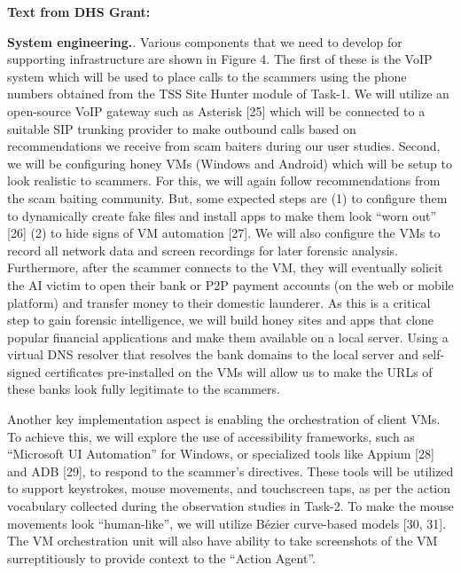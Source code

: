 \textbf{Text from DHS Grant:}

\textbf{System engineering.}. Various components that we need to develop for supporting
infrastructure are shown in Figure 4. The first of these is the VoIP system which will be used to place
calls to the scammers using the phone numbers obtained from the TSS Site Hunter module of Task-1. We
will utilize an open-source VoIP gateway such as Asterisk [25] which will be connected to a suitable SIP
trunking provider to make outbound calls based on recommendations we receive from scam baiters during
our user studies. Second, we will be configuring honey VMs (Windows and Android) which will be setup
to look realistic to scammers. For this, we will again follow recommendations from the scam baiting
community. But, some expected steps are (1) to configure them to dynamically create fake files and
install apps to make them look “worn out” [26] (2) to hide signs of VM automation [27]. We will also
configure the VMs to record all network data and screen recordings for later forensic analysis.
Furthermore, after the scammer connects to the VM, they will eventually solicit the AI victim to open
their bank or P2P payment accounts (on the web or mobile platform) and transfer money to their domestic
launderer. As this is a critical step to gain forensic intelligence, we will build honey sites and apps that
clone popular financial applications and make them available on a local server. Using a virtual DNS
resolver that resolves the bank domains to the local server and self-signed certificates pre-installed on the
VMs will allow us to make the URLs of these banks look fully legitimate to the scammers.


Another key implementation aspect is enabling the orchestration of client VMs. To achieve this, we will
explore the use of accessibility frameworks, such as “Microsoft UI Automation” for Windows, or
specialized tools like Appium [28] and ADB [29], to respond to the scammer's directives. These tools
will be utilized to support keystrokes, mouse movements, and touchscreen taps, as per the action
vocabulary collected during the observation studies in Task-2. To make the mouse movements look
“human-like”, we will utilize Bézier curve-based models [30, 31]. The VM orchestration unit will also
have ability to take screenshots of the VM surreptitiously to provide context to the “Action Agent”.


